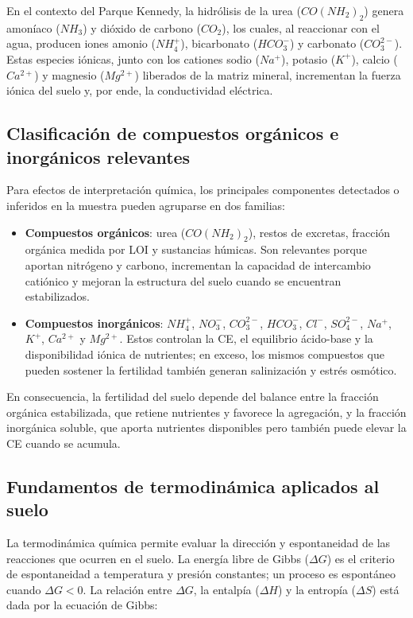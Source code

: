 \documentclass[fleqn]{jaes}
\begin{document}
En el contexto del Parque Kennedy, la hidrólisis de la urea ($CO(NH_2)_2$) genera amoníaco ($NH_3$) y dióxido de carbono ($CO_2$), los cuales, al reaccionar con el agua, producen iones amonio ($NH_4^+$), bicarbonato ($HCO_3^-$) y carbonato ($CO_3^{2-}$). Estas especies iónicas, junto con los cationes sodio ($Na^+$), potasio ($K^+$), calcio ($Ca^{2+}$) y magnesio ($Mg^{2+}$) liberados de la matriz mineral, incrementan la fuerza iónica del suelo y, por ende, la conductividad eléctrica.

\subsection{Clasificación de compuestos orgánicos e inorgánicos relevantes}

Para efectos de interpretación química, los principales componentes detectados o inferidos en la muestra pueden agruparse en dos familias:

\begin{itemize}
  \item \textbf{Compuestos orgánicos}: urea ($CO(NH_2)_2$), restos de excretas, fracción orgánica medida por LOI y sustancias húmicas. Son relevantes porque aportan nitrógeno y carbono, incrementan la capacidad de intercambio catiónico y mejoran la estructura del suelo cuando se encuentran estabilizados.
  \item \textbf{Compuestos inorgánicos}: $NH_4^+$, $NO_3^-$, $CO_3^{2-}$, $HCO_3^-$, $Cl^-$, $SO_4^{2-}$, $Na^+$, $K^+$, $Ca^{2+}$ y $Mg^{2+}$. Estos controlan la CE, el equilibrio ácido-base y la disponibilidad iónica de nutrientes; en exceso, los mismos compuestos que pueden sostener la fertilidad también generan salinización y estrés osmótico.
\end{itemize}

En consecuencia, la fertilidad del suelo depende del balance entre la fracción orgánica estabilizada, que retiene nutrientes y favorece la agregación, y la fracción inorgánica soluble, que aporta nutrientes disponibles pero también puede elevar la CE cuando se acumula.

\subsection{Fundamentos de termodinámica aplicados al suelo}

La termodinámica química permite evaluar la dirección y espontaneidad de las reacciones que ocurren en el suelo. La energía libre de Gibbs ($\Delta G$) es el criterio de espontaneidad a temperatura y presión constantes; un proceso es espontáneo cuando $\Delta G < 0$. La relación entre $\Delta G$, la entalpía ($\Delta H$) y la entropía ($\Delta S$) está dada por la ecuación de Gibbs:
\end{document}
